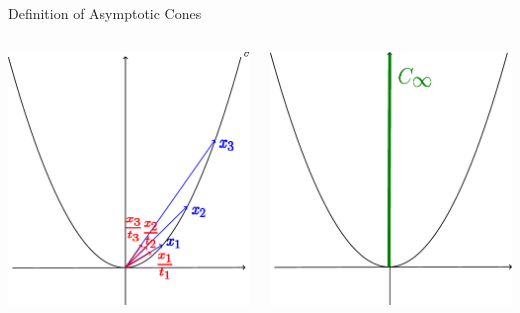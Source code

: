 \documentclass[aspectratio=169, dvipdfmx, 11pt]{beamer}
\begin{document}
\begin{frame}{Definition of Asymptotic Cones}
  \centering
  \begin{columns}
    \pause
    \begin{column}{0.48\textwidth}
    \centering
    \includegraphics[keepaspectratio, scale=0.09]{figures/figure_asymptotic_cone_1.eps}
    \end{column}
    \pause
    \begin{column}{0.48\textwidth}
    \centering
    \includegraphics[keepaspectratio, scale=0.09]{figures/figure_asymptotic_cone_2.eps}
    \end{column}
  \end{columns}
\end{frame}
\end{document}
